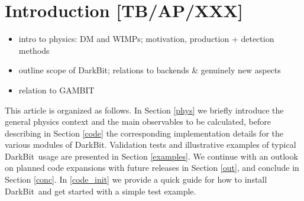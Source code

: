 
\date{\today}


\newcommand{\DB}{\mbox{\sf DarkBit}}
\newcommand{\GB}{\mbox{\sf GAMBIT}}


\maketitle

\begin{abstract}

Introducing \DB, physics motivation, main features (flexible and efficient interface; more realistic likelihoods
than typically implemented; further new features?). Mention link to \GB\ but emphasize standalone character. 
List examples for illustration...

\end{abstract}

\section{Introduction [TB/AP/XXX]}
\label{intro}

\begin{itemize}
\item intro to physics: DM and WIMPs; motivation, production + detection methods
\item outline scope of \DB; relations to backends \& genuinely new aspects
\item relation to \GB
\end{itemize}

This article is organized as follows. In Section \ref{phys} we  briefly introduce the general physics 
context and the main  observables to be calculated, before describing in Section \ref{code} the corresponding 
implementation details for the various modules of \DB. Validation tests and illustrative examples of typical
\DB\ usage are presented in Section \ref{examples}. We continue with an outlook on planned code expansions 
with future releases in Section \ref{out}, and conclude in Section \ref{conc}. In \ref{code_init} we provide a quick 
guide for how to install \DB\ and get started with a simple test example.

